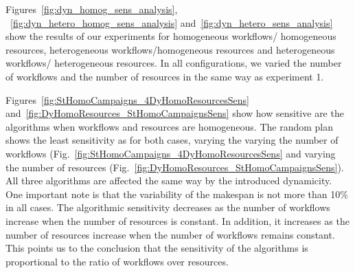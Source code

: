 Figures~\ref{fig:dyn_homog_sens_analysis}, ~\ref{fig:dyn_hetero_homog_sens_analysis} and~\ref{fig:dyn_hetero_sens_analysis} show the results of our experiments for homogeneous workflows/ homogeneous resources, heterogeneous workflows/homogeneous resources and heterogeneous workflows/ heterogeneous resources.
In all configurations, we varied the number of workflows and the number of resources in the same way as experiment 1.

Figures~\ref{fig:StHomoCampaigns_4DyHomoResourcesSens} and~\ref{fig:DyHomoResources_StHomoCampaignsSens} show how sensitive are the algorithms when workflows and resources are homogeneous.
The random plan shows the least sensitivity as for both cases, varying the varying the number of workflows (Fig.~\ref{fig:StHomoCampaigns_4DyHomoResourcesSens} and varying the number of resources (Fig.~\ref{fig:DyHomoResources_StHomoCampaignsSens}).
All three algorithms are affected the same way by the introduced dynamicity.
One important note is that the variability of the makespan is not more than 10\% in all cases.
The algorithmic sensitivity decreases as the number of workflows increase when the number of resources is constant.
In addition, it increases as the number of resources increase when the number of workflows remains constant.
This points us to the conclusion that the sensitivity of the algorithms is proportional to the ratio of workflows over resources.

